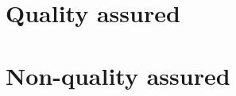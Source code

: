 \documentclass[11pt, a4paper, oneside, article]{memoir}
\begin{document}
\setlength{\baselineskip}{15pt}         %
\section{Quality assured}
\cite{ACP:Falk2017}
\cite{GMD:Falk2018}
\cite{GMD:Falk2019}
\cite{wcd-1-481-2020}
\cite{app10124222}
\cite{ISI:000576640000015}
\cite{ISI:000467578000001}
\cite{ISI:000457948900009}
\cite{ISI:000464504800004}
\cite{ISI:000448091600029}
\cite{ISI:000436245600022}
\cite{ISI:000436245600026}
\cite{ISI:000423829500001}
\cite{ISI:000407104400005}
\cite{ISI:000398187900001}
\cite{ISI:000398187800003}
\section{Non-quality assured}
\cite{IVL:Karlsson2021}
\cite{EGU:Falk2021}
\cite{ICPTF:Falk2021}
\cite{ICPTF:Falk2020}
\cite{CESMWP:Falk2021}
\cite{blog:Falk2021}

\backmatter
\setcounter{page}{1}
\appendix
\printbibliography[type=article,title=Quality assured]
\printbibliography[nottype=article,title=Non-quality assured]
\end{document}
